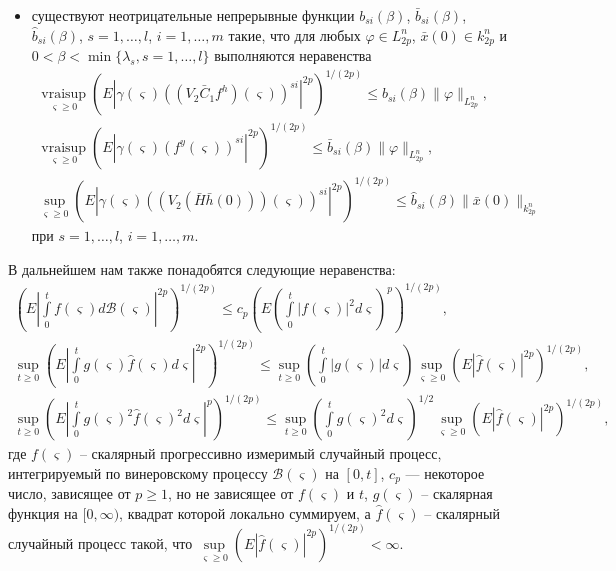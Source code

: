 \begin{itemize}
    \item  существуют неотрицательные непрерывные функции $b_{si}(\beta)$,
    $\bar b_{si}(\beta)$, $\hat b_{si}(\beta)$, $s= 1, \dots, l$, $i= 1,
    \dots, m$ такие,  что для любых $\varphi \in L^n_{2p}$, $\bar x(0) \in
    k_{2p}^n$ и  $0<\beta < \min \{\lambda _s, s = 1, \dots, l \}$
    выполняются неравенства
     \begin{gather*} 
        \mathrel {\mathop
     {vrai \sup} \limits _{\varsigma \geq 0}} \left(E\left |\gamma (\varsigma )
    ((V_2 \bar C_1 f^h)(\varsigma))^{si}\right |^{2p}\right)^{1/(2p)}
    \leq b_{si}(\beta) \|\varphi \|_{L^n_{2p}}, \\
    \mathrel {\mathop
     {vrai \sup} \limits _{\varsigma \geq 0} }\left(E\left|\gamma (\varsigma )
    (f^y(\varsigma ))^{si}\right|^{2p}\right)^{1/(2p)}\leq \bar
    b_{si}(\beta) \|\varphi \|_{L^n_{2p}},\\
    \sup \limits _{\varsigma \geq 0}\left (E\left |\gamma (\varsigma)
    ((V_2(\bar H \bar h(0)))(\varsigma))^{si}\right |^{2p}\right
    )^{1/(2p)} \leq \hat b_{si}(\beta)\|\bar x(0)\|_{k^n_{2p}}
    \end{gather*} 
    при $s = 1,\dots,l$, $i = 1, \dots, m$.
\end{itemize}

В дальнейшем нам также понадобятся следующие неравенства:\\
 \begin{gather}
    \label{eq:kri-11}
    \left (E\left |\int \limits _0^tf(\varsigma )d\mathcal B(\varsigma
    )\right |^{2p}\right )^{1/(2p)} \leq c_p \left (E\left (\int \limits
    _0^t|f(\varsigma )|^2d\varsigma\right )^p\right )^{1/(2p)},
    \\
    \label{eq:kri-12}
     \sup \limits _{t \geq 0}\left(E\left|\int \limits
     _0^tg(\varsigma)\hat f(\varsigma)d\varsigma\right|^{2p}\right)^{1/(2p)}
     \leq \sup \limits _{t \geq 0}\left (\int \limits
     _0^t|g(\varsigma)|d\varsigma\right )
     \sup \limits _{\varsigma \geq
     0}\left (E\left |\hat f(\varsigma)\right |^{2p}\right )^{1/(2p)},
     \\
\label{eq:kri-13}
\sup \limits _{t \geq 0}\left(E|\int \limits
 _0^tg(\varsigma)^2\hat f(\varsigma)^2d\varsigma|^{p}\right)^{1/(2p)} \leq
 \sup \limits _{t \geq 0}\left(\int \limits
 _0^tg(\varsigma)^2d\varsigma\right)^{1/2}\sup \limits _{\varsigma
 \geq 0}\left (E\left |\hat f(\varsigma)\right |^{2p}\right )^{1/(2p)},
\end{gather}
где $f(\varsigma )$ -- скалярный прогрессивно измеримый случайный
процесс, интегрируемый по винеровскому процессу  $\mathcal
B(\varsigma )$ на $[0, t]$, $c_p$ --- некоторое число, зависящее от
$p\ge 1$, но не зависящее от $f(\varsigma )$ и $t$, $g(\varsigma)$
-- скалярная функция на $[0,
 \infty)$, квадрат которой локально суммируем, а $\hat f(\varsigma)$ --
скалярный случайный процесс такой, что $\sup \limits _{\varsigma
\geq 0}\left (E\left |\hat f(\varsigma)\right |^{2p}\right
)^{1/(2p)} < \infty$.

